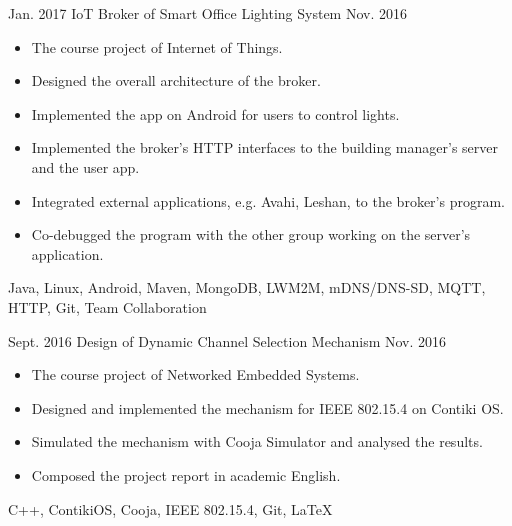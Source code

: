 %
%
%
%
%


\begin{projects}
  
  
  \project
    {Jan. 2017}   {IoT Broker of Smart Office Lighting System}
    {Nov. 2016} {
                      \begin{itemize}
                        \item The course project of Internet of Things.
                        \item Designed the overall architecture of the broker.
                        \item Implemented the app on Android for users to control lights.  
                        \item Implemented the broker’s HTTP interfaces to the building manager's server and the user app.
                        \item Integrated external applications, e.g. Avahi, Leshan, to the broker's program.
                        \item Co-debugged the program with the other group working on the server's application.           
                      \end{itemize}
                    }
                    {Java, Linux, Android, Maven, MongoDB, LWM2M, mDNS/DNS-SD, MQTT, HTTP, Git, Team Collaboration}
  \emptySeparator
  
  \project
  {Sept. 2016} {Design of Dynamic Channel Selection Mechanism}
  {Nov. 2016}    {
  	\begin{itemize}
  		\item The course project of Networked Embedded Systems.
  		\item Designed and implemented the mechanism for IEEE 802.15.4 on Contiki OS. 
  		\item Simulated the mechanism with Cooja Simulator and analysed the results.
  		\item Composed the project report in academic English.
  	\end{itemize}
  }
  {C++, ContikiOS, Cooja, IEEE 802.15.4, Git, \LaTeX}
  \emptySeparator
  

\end{projects}

